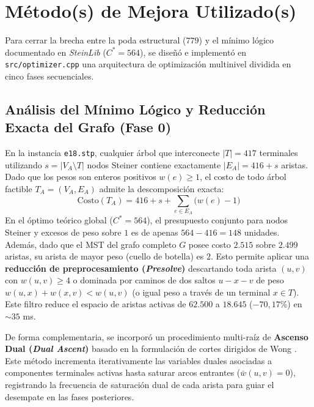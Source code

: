 \documentclass[11pt,a4paper]{article}
\begin{document}
\section{Método(s) de Mejora Utilizado(s)}
\label{sec:heuristica}

Para cerrar la brecha entre la poda estructural ($779$) y el mínimo lógico documentado en \textit{SteinLib} ($C^* = 564$), se diseñó e implementó en \texttt{src/optimizer.cpp} una arquitectura de optimización multinivel dividida en cinco fases secuenciales.

\subsection{Análisis del Mínimo Lógico y Reducción Exacta del Grafo (Fase 0)}
En la instancia \texttt{e18.stp}, cualquier árbol que interconecte $|T| = 417$ terminales utilizando $s = |V_A \setminus T|$ nodos Steiner contiene exactamente $|E_A| = 416 + s$ aristas. Dado que los pesos son enteros positivos $w(e) \ge 1$, el costo de todo árbol factible $T_A = (V_A, E_A)$ admite la descomposición exacta:
\begin{equation}
    \text{Costo}(T_A) = 416 + s + \sum_{e \in E_A} \big(w(e) - 1\big)
\end{equation}
En el óptimo teórico global ($C^* = 564$), el presupuesto conjunto para nodos Steiner y excesos de peso sobre $1$ es de apenas $564 - 416 = 148$ unidades. Además, dado que el MST del grafo completo $G$ posee costo $2.515$ sobre $2.499$ aristas, su arista de mayor peso (cuello de botella) es $2$. Esto permite aplicar una \textbf{reducción de preprocesamiento (\textit{Presolve})} descartando toda arista $(u, v)$ con $w(u, v) \ge 4$ o dominada por caminos de dos saltos $u - x - v$ de peso $w(u,x) + w(x,v) < w(u,v)$ (o igual peso a través de un terminal $x \in T$). Este filtro reduce el espacio de aristas activas de $62.500$ a $18.645$ ($-70,17\%$) en $\sim 35$ ms.

De forma complementaria, se incorporó un procedimiento multi-raíz de \textbf{Ascenso Dual (\textit{Dual Ascent})} basado en la formulación de cortes dirigidos de Wong \cite{wong1984dual}. Este método incrementa iterativamente las variables duales asociadas a componentes terminales activas hasta saturar arcos entrantes ($\bar{w}(u, v) = 0$), registrando la frecuencia de saturación dual de cada arista para guiar el desempate en las fases posteriores.
\end{document}
